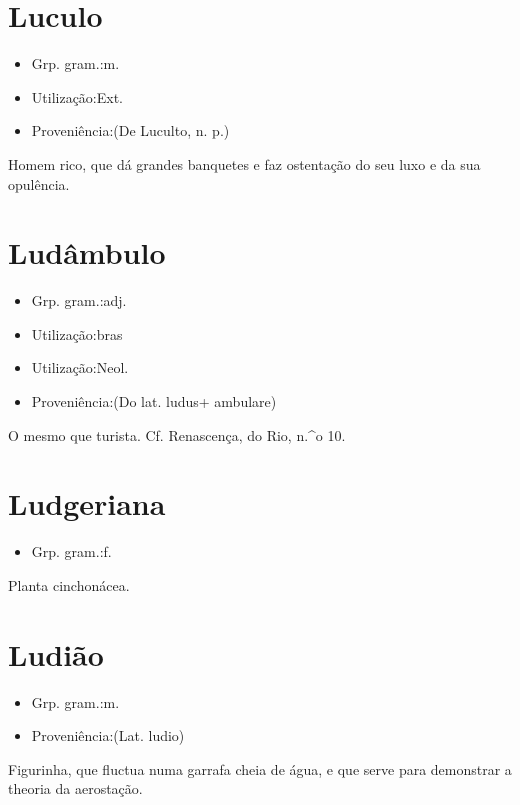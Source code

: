 \section{Luculo}
\begin{itemize}
\item {Grp. gram.:m.}
\end{itemize}
\begin{itemize}
\item {Utilização:Ext.}
\end{itemize}
\begin{itemize}
\item {Proveniência:(De \textunderscore Luculto\textunderscore , n. p.)}
\end{itemize}
Homem rico, que dá grandes banquetes e faz ostentação do seu luxo e da sua opulência.
\section{Ludâmbulo}
\begin{itemize}
\item {Grp. gram.:adj.}
\end{itemize}
\begin{itemize}
\item {Utilização:bras}
\end{itemize}
\begin{itemize}
\item {Utilização:Neol.}
\end{itemize}
\begin{itemize}
\item {Proveniência:(Do lat. \textunderscore ludus\textunderscore  + \textunderscore ambulare\textunderscore )}
\end{itemize}
O mesmo que \textunderscore turista\textunderscore . Cf. \textunderscore Renascença\textunderscore , do Rio, n.^o 10.
\section{Ludgeriana}
\begin{itemize}
\item {Grp. gram.:f.}
\end{itemize}
Planta cinchonácea.
\section{Ludião}
\begin{itemize}
\item {Grp. gram.:m.}
\end{itemize}
\begin{itemize}
\item {Proveniência:(Lat. \textunderscore ludio\textunderscore )}
\end{itemize}
Figurinha, que fluctua numa garrafa cheia de água, e que serve para demonstrar a theoria da aerostação.
